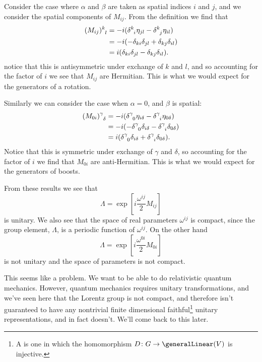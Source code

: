 \documentclass[fleqn]{NotesClass}
\newcommand{\minkowskiMetric}{\eta}
\begin{document}
    Consider the case where \(\alpha\) and \(\beta\) are taken as spatial indices \(i\) and \(j\), and we consider the spatial components of \(M_{ij}\).
    From the definition we find that
    \begin{align}
        \tensor{(M_{ij})}{^k_l} &= -i(\tensor{\delta}{^k_i} \minkowskiMetric_{jl} - \tensor{\delta}{^k_j} \minkowskiMetric_{il})\\
        &= -i(-\delta_{ki}\delta_{jl} + \delta_{kj}\delta_{il})\\
        &= i(\delta_{ki}\delta_{jl} - \delta_{kj}\delta_{il}).
    \end{align}
    notice that this is antisymmetric under exchange of \(k\) and \(l\), and so accounting for the factor of \(i\) we see that \(M_{ij}\) are Hermitian.
    This is what we would expect for the generators of a rotation.
    
    Similarly we can consider the case when \(\alpha = 0\), and \(\beta\) is spatial:
    \begin{align}
        \tensor{(M_{0i})}{^\gamma_\delta} &= -i(\tensor{\delta}{^\gamma_0} \minkowskiMetric_{i\delta} - \tensor{\delta}{^\gamma_i} \minkowskiMetric_{0\delta})\\
        &= -i(-\tensor{\delta}{^\gamma_0} \delta_{i\delta} - \tensor{\delta}{^\gamma_i}\delta_{0\delta})\\
        &= i(\tensor{\delta}{^\gamma_0} \delta_{i\delta} + \tensor{\delta}{^\gamma_i}\delta_{0\delta}).
    \end{align}
    Notice that this is symmetric under exchange of \(\gamma\) and \(\delta\), so accounting for the factor of \(i\) we find that \(M_{0i}\) are anti-Hermitian.
    This is what we would expect for the generators of boosts.
    
    From these results we see that
    \begin{equation}
        \Lambda = \exp\left[ i\frac{\omega^{ij}}{2} M_{ij} \right]
    \end{equation}
    is unitary.
    We also see that the space of real parameters \(\omega^{ij}\) is compact, since the group element, \(\Lambda\), is a periodic function of \(\omega^{ij}\).
    On the other hand
    \begin{equation}
        \Lambda = \exp\left[ i\frac{\omega^{0i}}{2}M_{0i} \right]
    \end{equation}
    is not unitary and the space of parameters is not compact.
    
    This seems like a problem.
    We want to be able to do relativistic quantum mechanics.
    However, quantum mechanics requires unitary transformations, and we've seen here that the Lorentz group is not compact, and therefore isn't guaranteed to have any nontrivial finite dimensional faithful\footnote{A  is one in which the homomorphism \(D \colon G \to \generalLinear(V)\) is injective.} unitary representations, and in fact doesn't.
    We'll come back to this later.
    
\end{document}

